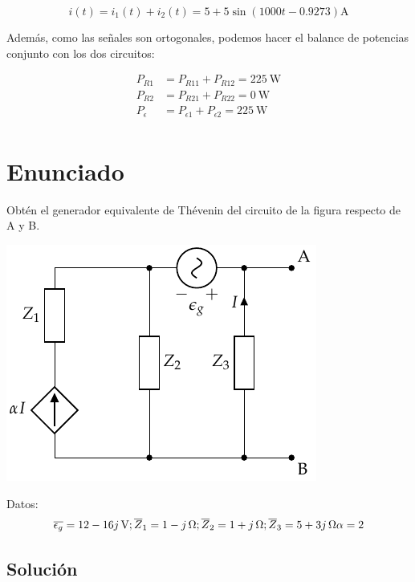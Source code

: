 \begin{equation*}
  i(t) = i_1(t) + i_2(t) = 5 + 5\sin(1000t - 0.9273)\si{\ampere}
\end{equation*}

Además, como las señales son ortogonales, podemos hacer el balance de potencias conjunto con los dos circuitos:

\begin{align*}
  P_{R1} &= P_{R11} + P_{R12} = \qty{225}{\watt}\\
  P_{R2} &= P_{R21} + P_{R22} = \qty{0}{\watt}\\
  P_{\epsilon} &= P_{\epsilon1} + P_{\epsilon2} = \qty{225}{\watt}\\
\end{align*}
\section{Enunciado}
Obtén el generador equivalente de Thévenin del circuito de la figura respecto de A y B.

\begin{center}
\includegraphics{figuras/Thevenin4}
\end{center}

Datos:
\begin{equation*}
  \overline{\epsilon_g} = \qty[parse-numbers=false]{12 - 16j}{\volt};
  \overline{Z}_1 = \qty[parse-numbers=false]{1 - j}{\ohm};
  \overline{Z}_2 = \qty[parse-numbers=false]{1 + j}{\ohm};
  \overline{Z}_3 = \qty[parse-numbers=false]{5 + 3j}{\ohm}
  \alpha = 2
\end{equation*}


\subsection*{Solución}

